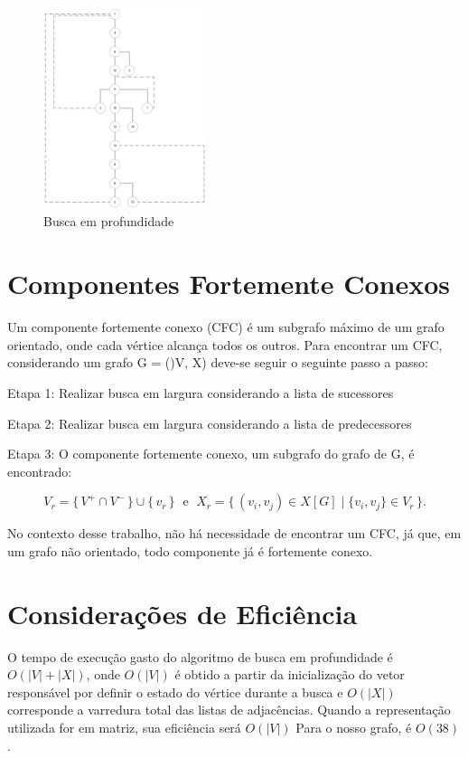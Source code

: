 \begin{figure}[H]
	\centering
	\includegraphics[width=0.425\textwidth]{figuras/BuscaProfundidade.png}
	\caption{Busca em profundidade}
	\label{fig:BusProf}
\end{figure}

\section{Componentes Fortemente Conexos}\label{sec:compFC}

Um componente fortemente conexo (CFC) é um subgrafo máximo de um grafo orientado, onde cada vértice alcança todos os outros. Para encontrar um CFC, considerando um grafo G = ()V, X) deve-se seguir o seguinte passo a passo:

Etapa 1: Realizar busca em largura considerando a lista de sucessores

Etapa 2: Realizar busca em largura considerando a lista de predecessores

Etapa 3: O componente fortemente conexo, um subgrafo do grafo de G, é encontrado: 

\begin{equation}
	V_r = \{\,V^+ \cap V^-\,\} \cup \{\,v_r\,\} \;\text{ e }\;
	X_r = \{\, (v_i,v_j) \in X[G] \mid \{v_i,v_j\} \in V_r \,\}.
\end{equation}


No contexto desse trabalho, não há necessidade de encontrar um CFC, já que, em um grafo não orientado, todo componente já é fortemente conexo.

\section{Considerações de Eficiência}\label{sec:eficienciaBusca}

O tempo de execução gasto do algoritmo de busca em profundidade é $ O(|V|+|X|) $, onde $ O(|V|) $ é obtido a partir da inicialização do vetor responsável por definir o estado do vértice durante a busca e $ O(|X|) $ corresponde a varredura total das listas de adjacências. Quando a representação utilizada for em matriz, sua eficiência será $ O(|V|) $
Para o nosso grafo, é $ O(38) $.

